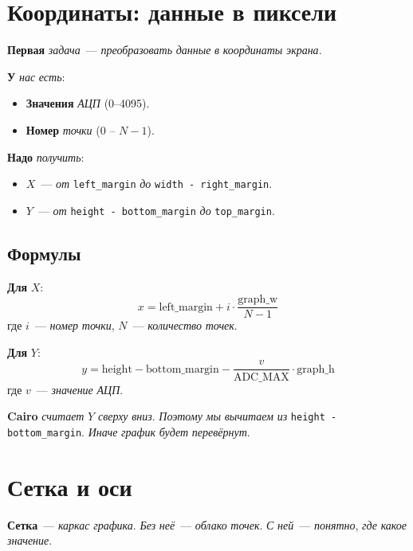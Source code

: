 \section{Координаты: данные в пиксели}
\label{sec:render-coords}

\textbf{Первая} \emph{задача}~--- \emph{преобразовать}
\emph{данные} \emph{в} \emph{координаты} \emph{экрана}.

\textbf{У} \emph{нас} \emph{есть}:
\begin{itemize}
    \item \textbf{Значения} \emph{АЦП} (\num{0}--\num{4095}).
    \item \textbf{Номер} \emph{точки} ($0$ -- $N-1$).
\end{itemize}

\textbf{Надо} \emph{получить}:
\begin{itemize}
    \item \textbf{$X$}~--- \emph{от} \texttt{left\_margin}
          \emph{до} \texttt{width - right\_margin}.
    \item \textbf{$Y$}~--- \emph{от} \texttt{height - bottom\_margin}
          \emph{до} \texttt{top\_margin}.
\end{itemize}


\subsection{Формулы}

\textbf{Для} \emph{$X$}:
\[
x = \text{left\_margin} + i \cdot \frac{\text{graph\_w}}{N - 1}
\]
где \(i\)~--- \emph{номер} \emph{точки}, \(N\)~--- \emph{количество}
\emph{точек}.

\textbf{Для} \emph{$Y$}:
\[
y = \text{height} - \text{bottom\_margin}
    - \frac{v}{\text{ADC\_MAX}} \cdot \text{graph\_h}
\]
где \(v\)~--- \emph{значение} \emph{АЦП}.

\begin{keybox}
\textbf{Cairo} \emph{считает} \emph{$Y$} \emph{сверху}
\emph{вниз}. \emph{Поэтому} \emph{мы} \emph{вычитаем} \emph{из}
\texttt{height - bottom\_margin}. \emph{Иначе} \emph{график}
\emph{будет} \emph{перевёрнут}.
\end{keybox}

\section{Сетка и оси}
\label{sec:render-grid}

\textbf{Сетка}~--- \emph{каркас} \emph{графика}. \emph{Без}
\emph{неё}~--- \emph{облако} \emph{точек}. \emph{С} \emph{ней}~---
\emph{понятно}, \emph{где} \emph{какое} \emph{значение}.


